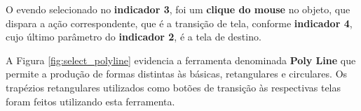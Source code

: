 \begin{figure}[ht!]
	\centering
\end{figure}


O evendo selecionado no \textbf{indicador 3}, 
foi um \textbf{clique do mouse} no objeto, 
que dispara a ação correspondente, 
que é a transição de tela, 
conforme \textbf{indicador 4}, 
cujo último parâmetro do \textbf{indicador 2}, 
é a tela de destino. 



A Figura \ref{fig:select_polyline} 
evidencia a ferramenta denominada \textbf{Poly Line} 
que permite a produção de formas distintas às básicas, 
retangulares e circulares. 
Os trapézios retangulares utilizados como botões de transição 
às respectivas telas foram feitos utilizando esta ferramenta. 


\begin{figure}[ht!]
	\centering
\end{figure}

